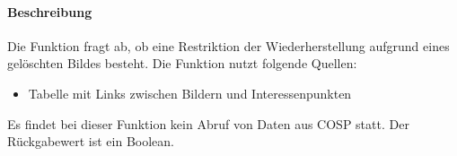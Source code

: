 \paragraph{Beschreibung} Die Funktion fragt ab, ob eine Restriktion der Wiederherstellung aufgrund eines gelöschten Bildes besteht. Die Funktion nutzt folgende Quellen:
\begin{itemize}
	\item Tabelle mit Links zwischen Bildern und Interessenpunkten
\end{itemize}
Es findet bei dieser Funktion kein Abruf von Daten aus {\glqq COSP\grqq} statt. Der Rückgabewert ist ein Boolean.